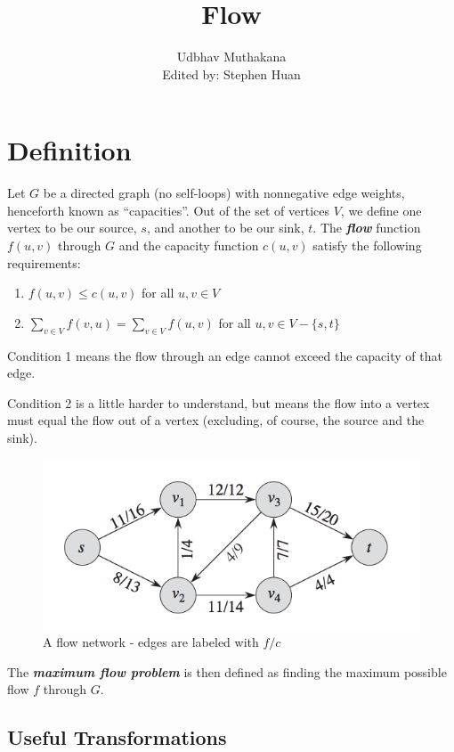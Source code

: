 \documentclass[11pt, oneside]{article}
\title{Flow}
\author{Udbhav Muthakana \\ Edited by: Stephen Huan}
\newcommand{\smallemphasis}[1]{\textbf{\textit{#1}}}
\begin{document}
\maketitle

\section{Definition}
Let \( G \) be a directed graph (no self-loops) with nonnegative edge weights, henceforth known as ``capacities''. Out of the set of vertices \( V \), we define one vertex to be our source, \( s \), and another to be our sink, \( t \). The \smallemphasis{flow} function \(f(u, v) \) through \( G \) and the capacity function \( c(u, v) \) satisfy the following requirements:

\begin{enumerate}
   \item \( f(u, v) \leq c(u, v) \) for all \( u, v \in V \)
   \item \( \sum_{v \in V} f(v, u) = \sum_{v \in V} f(u, v) \) for all \( u, v \in V - \{s, t\} \)
\end{enumerate}

Condition 1 means the flow through an edge cannot exceed the capacity of that edge.

Condition 2 is a little harder to understand, but means the flow into a vertex must equal the flow out of a vertex (excluding, of course, the source and the sink).

\begin{figure}[h!]
\centering
\includegraphics[scale=1]{flowdiagram}
\caption{A flow network - edges are labeled with \( f/c \)}
\end{figure}

The \smallemphasis{maximum flow problem} is then defined as finding the maximum possible flow \( f \) through \( G \).

\newpage
\subsection{Useful Transformations}
\end{document}
